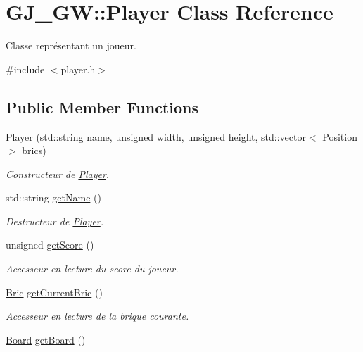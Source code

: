 \hypertarget{class_g_j___g_w_1_1_player}{}\section{G\+J\+\_\+\+GW\+:\+:Player Class Reference}
\label{class_g_j___g_w_1_1_player}


Classe représentant un joueur.  




{\ttfamily \#include $<$player.\+h$>$}

\subsection*{Public Member Functions}
\begin{DoxyCompactItemize}
\item 
\hyperlink{class_g_j___g_w_1_1_player_ae396a3f2009531d4831cee0eaa7a24c4}{Player} (std\+::string name, unsigned width, unsigned height, std\+::vector$<$ \hyperlink{class_g_j___g_w_1_1_position}{Position} $>$ brics)
\begin{DoxyCompactList}\small\item\em Constructeur de \hyperlink{class_g_j___g_w_1_1_player}{Player}. \end{DoxyCompactList}\item 
std\+::string \hyperlink{class_g_j___g_w_1_1_player_a70b2063f40837677855bc71338f24ead}{get\+Name} ()
\begin{DoxyCompactList}\small\item\em Destructeur de \hyperlink{class_g_j___g_w_1_1_player}{Player}. \end{DoxyCompactList}\item 
unsigned \hyperlink{class_g_j___g_w_1_1_player_ae3f20da9bd95ea3da68fe0948e76bf09}{get\+Score} ()
\begin{DoxyCompactList}\small\item\em Accesseur en lecture du score du joueur. \end{DoxyCompactList}\item 
\hyperlink{class_g_j___g_w_1_1_bric}{Bric} \hyperlink{class_g_j___g_w_1_1_player_a71d0ac01f202e7e53dd626c38a245e19}{get\+Current\+Bric} ()
\begin{DoxyCompactList}\small\item\em Accesseur en lecture de la brique courante. \end{DoxyCompactList}\item 
\hyperlink{class_g_j___g_w_1_1_board}{Board} \hyperlink{class_g_j___g_w_1_1_player_a2c0e7ff9befab31e575fb6100a460d45}{get\+Board} ()

\end{DoxyCompactItemize}
